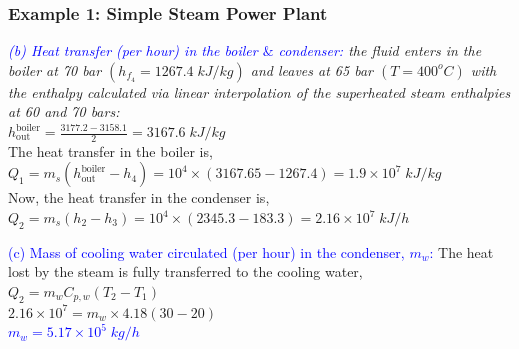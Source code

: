 \documentclass[10pt,compress,handout,ignorenonframetext]{beamer}
\begin{document}
\begin{frame}
 \frametitle{Example 1: Simple Steam Power Plant}
    {\it 
    \textcolor{blue}{(b) Heat transfer (per hour) in the boiler $\&$ condenser:} the fluid enters in the boiler at 70 bar $\left(h_{f_{4}}=1267.4\;kJ/kg\right)$ and leaves at 65 bar $\left(T=400^{o}C\right)$ with the enthalpy calculated via linear interpolation of the superheated steam enthalpies at 60 and 70 bars:}\\
\medskip
$h_{\text{out}}^{\text{boiler}}=\displaystyle\frac{3177.2-3158.1}{2}=3167.6\;kJ/kg$\\
The heat transfer in the boiler is, \\
$Q_{1}=m_{s}\left(h_{\text{out}}^{\text{boiler}}-h_{4}\right)=10^{4}\times\left(3167.65-1267.4\right)=1.9\times 10^{7}\;kJ/kg$
\\
\medskip
Now, the heat transfer in the condenser is,\\
\medskip
$Q_{2}=m_{s}\left(h_{2}-h_{3}\right)=10^{4}\times\left(2345.3-183.3\right)=2.16\times 10^{7}\; kJ/h$\\
\medskip

\textcolor{blue}{(c) Mass of cooling water circulated (per hour) in the condenser, $m_{w}$:} The heat lost by the steam is fully transferred to the cooling water,\\
\medskip 
$Q_{2}=m_{w}C_{p,w}\left(T_{2}-T_{1}\right)$\\
\medskip
$2.16\times 10^{7} = m_{w}\times 4.18\left(30-20\right)$\\
\medskip
\textcolor{blue}{$m_{w}=5.17\times 10^{5}\;kg/h$}


 \normalsize
\end{frame}
\end{document}
